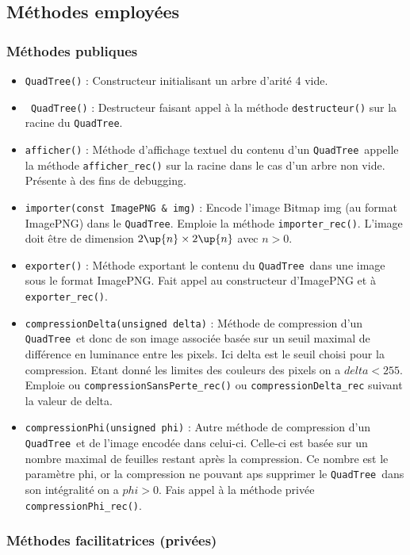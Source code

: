 \documentclass{article}
\newcommand{\info}{\texttt}
\newcommand{\qt}{\info{QuadTree}}
\begin{document}
    \subsection{Méthodes employées}

		\subsubsection{Méthodes publiques}
		
		\begin{itemize}
	    	\item \info{QuadTree()} : Constructeur initialisant un arbre d'arité 4 vide.
	    	\item \info{~QuadTree()} : Destructeur faisant appel à la méthode \info{destructeur()} sur la racine du \qt.
	    	\item \info{afficher()} : Méthode d'affichage textuel du contenu d'un \qt\, appelle la méthode \info{afficher\_rec()} sur la racine dans le cas d'un arbre non vide. Présente à des fins de debugging.
	    	\item \info{importer(const ImagePNG \& img)} : Encode l'image Bitmap img (au format ImagePNG) dans le \qt. Emploie la méthode \info{importer\_rec()}. L'image doit être de dimension $2\up{n}\times2\up{n}$ avec $n>0$.
	    	\item \info{exporter()} : Méthode exportant le contenu du \qt\ dans une image sous le format ImagePNG. Fait appel au constructeur d'ImagePNG et à \info{exporter\_rec()}.
	    	\item \info{compressionDelta(unsigned delta)} : Méthode de compression d'un \qt\ et donc de son image associée basée sur un seuil maximal de différence en luminance entre les pixels. Ici delta est le seuil choisi pour la compression. Etant donné les limites des couleurs des pixels on a $delta<255$. Emploie ou \info{compressionSansPerte\_rec()} ou \info{compressionDelta\_rec} suivant la valeur de delta.
	    	\item \info{compressionPhi(unsigned phi)} : Autre méthode de compression d'un \qt\ et de l'image encodée dans celui-ci. Celle-ci est basée sur un nombre maximal de feuilles restant après la compression. Ce nombre est le paramètre phi, or la compression ne pouvant aps supprimer le \qt\ dans son intégralité on a $phi>0$. Fais appel à la méthode privée \info{compressionPhi\_rec()}.
	    \end{itemize}
	    
	    \subsubsection{Méthodes facilitatrices (privées)}
	    
\end{document}
